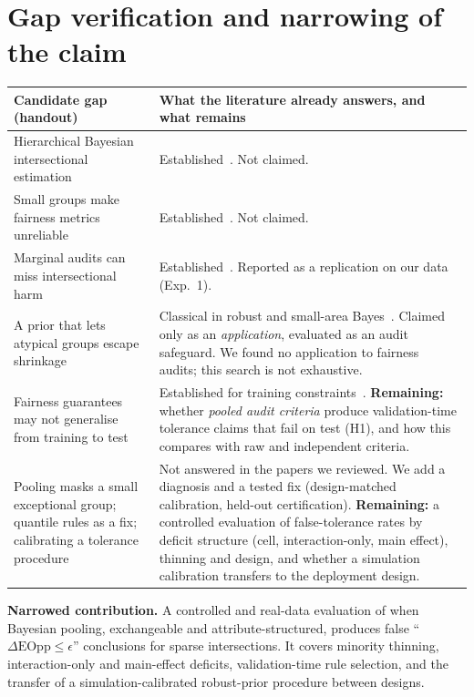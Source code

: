 \documentclass[10pt]{article}
\begin{document}
\section{Gap verification and narrowing of the claim}
\begin{tabularx}{\textwidth}{@{}L{4.6cm}X@{}}
\toprule
Candidate gap (handout) & What the literature already answers, and what remains \\
\midrule
Hierarchical Bayesian intersectional estimation & Established~\cite{foulds2020bayes,ji2020,herlihy2024}. Not claimed. \\
Small groups make fairness metrics unreliable & Established~\cite{foulds2020bayes,lum2022,himmelreich2025}. Not claimed. \\
Marginal audits can miss intersectional harm & Established~\cite{kearns2018,molina2022}. Reported as a replication on our data (Exp.~1). \\
A prior that lets atypical groups escape shrinkage & Classical in robust and small-area Bayes~\cite{berger1986,datta1995}. Claimed only as an \emph{application}, evaluated as an audit safeguard. We found no application to fairness audits; this search is not exhaustive. \\
Fairness guarantees may not generalise from training to test & Established for training constraints~\cite{cotter2019}. \textbf{Remaining:} whether \emph{pooled audit criteria} produce validation-time tolerance claims that fail on test (H1), and how this compares with raw and independent criteria. \\
Pooling masks a small exceptional group; quantile rules as a fix; calibrating a tolerance procedure & Not answered in the papers we reviewed. We add a diagnosis and a tested fix (design-matched calibration, held-out certification). \textbf{Remaining:} a controlled evaluation of false-tolerance rates by deficit structure (cell, interaction-only, main effect), thinning and design, and whether a simulation calibration transfers to the deployment design. \\
\bottomrule
\end{tabularx}

\medskip
\noindent\textbf{Narrowed contribution.} A controlled and real-data evaluation of when Bayesian pooling, exchangeable and
attribute-structured, produces false ``$\Delta\text{EOpp}\le\epsilon$'' conclusions for sparse intersections. It covers
minority thinning, interaction-only and main-effect deficits, validation-time rule selection, and the transfer of a
simulation-calibrated robust-prior procedure between designs.
\end{document}
